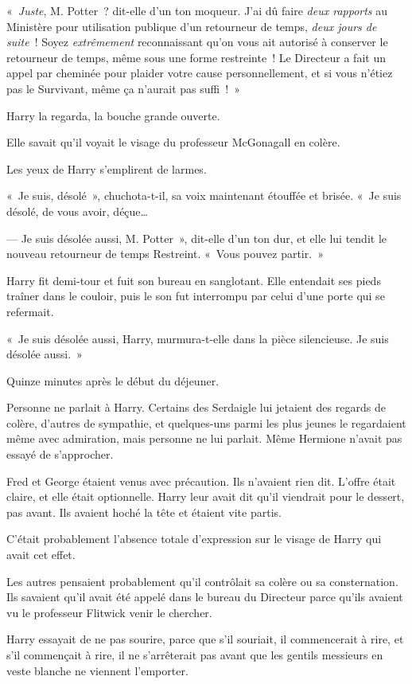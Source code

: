«~\emph{Juste}, M. Potter~? dit-elle d'un ton moqueur.
J'ai dû faire \emph{deux rapports} au Ministère pour utilisation publique d'un retourneur de temps, \emph{deux jours de suite}~!
Soyez \emph{extrêmement} reconnaissant qu'on vous ait autorisé à conserver le retourneur de temps, même sous une forme restreinte~!
Le Directeur a fait un appel par cheminée pour plaider votre cause personnellement, et si vous n'étiez pas le Survivant, même ça n'aurait pas suffi~!~»

Harry la regarda, la bouche grande ouverte.

Elle savait qu'il voyait le visage du professeur McGonagall en colère.

Les yeux de Harry s'emplirent de larmes.

«~Je suis, désolé~», chuchota-t-il, sa voix maintenant étouffée et brisée.
«~Je suis désolé, de vous avoir, déçue…

--- Je suis désolée aussi, M. Potter~», dit-elle d'un ton dur, et elle lui tendit le nouveau retourneur de temps Restreint.
«~Vous pouvez partir.~»

Harry fit demi-tour et fuit son bureau en sanglotant.
Elle entendait ses pieds traîner dans le couloir, puis le son fut interrompu par celui d'une porte qui se refermait.

«~Je suis désolée aussi, Harry, murmura-t-elle dans la pièce silencieuse.
Je suis désolée aussi.~»

\later

Quinze minutes après le début du déjeuner.

Personne ne parlait à Harry.
Certains des Serdaigle lui jetaient des regards de colère, d'autres de sympathie, et quelques-uns parmi les plus jeunes le regardaient même avec admiration, mais personne ne lui parlait.
Même Hermione n'avait pas essayé de s'approcher.

Fred et George étaient venus avec précaution.
Ils n'avaient rien dit.
L'offre était claire, et elle était optionnelle.
Harry leur avait dit qu'il viendrait pour le dessert, pas avant.
Ils avaient hoché la tête et étaient vite partis.

C'était probablement l'absence totale d'expression sur le visage de Harry qui avait cet effet.

Les autres pensaient probablement qu'il contrôlait sa colère ou sa consternation.
Ils savaient qu'il avait été appelé dans le bureau du Directeur parce qu'ils avaient vu le professeur Flitwick venir le chercher.

Harry essayait de ne pas sourire, parce que s'il souriait, il commencerait à rire, et s'il commençait à rire, il ne s'arrêterait pas avant que les gentils messieurs en veste blanche ne viennent l'emporter.

